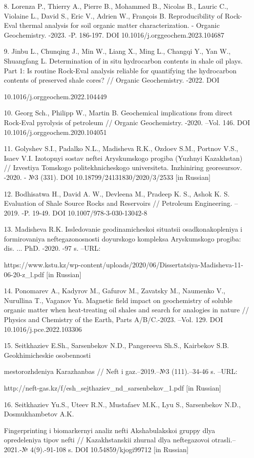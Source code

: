 \begin{noparindent}
8.
  Lorenza P., Thierry A., Pierre B., Mohammed B., Nicolas B., Lauric C.,
  Violaine L., David S., Eric V., Adrien W., François B. Reproducibility
  of Rock-Eval thermal analysis for soil organic matter
  characterization. - Organic Geochemistry. -2023. -P. 186-197. DOI
  10.1016/j.orggeochem.2023.104687

9.
  Jinbu L., Chunqing J., Min W., Liang X., Ming L., Changqi Y., Yan W.,
  Shuangfang L. Determination of in situ hydrocarbon contents in shale
  oil plays. Part 1: Is routine Rock-Eval analysis reliable for
  quantifying the hydrocarbon contents of preserved shale cores? //
  Organic Geochemistry. -2022. DOI

  10.1016/j.orggeochem.2022.104449

10.
  Georg Sch., Philipp W., Martin B. Geochemical implications from direct
  Rock-Eval pyrolysis of petroleum // Organic Geochemistry. -2020.
  --Vol. 146. DOI 10.1016/j.orggeochem.2020.104051

11.
  Golyshev S.I., Padalko N.L., Madisheva R.K., Ozdoev S.M., Portnov
  V.S., Isaev V.I. Izotopnyi sostav neftei Aryskumskogo progiba (Yuzhnyi
  Kazakhstan) // Izvestiya Tomskogo politekhnicheskogo universiteta.
  Inzhiniring georesursov. -2020. - №3 (331). DOI
  10.18799/24131830/2020/3/2533 {[}in Russian{]}

12.
  Bodhisatwa H., David A. W., Devleena M., Pradeep K. S., Ashok K. S.
  Evaluation of Shale Source Rocks and Reservoirs // Petroleum
  Engineering. --2019. -P. 19-49. DOI 10.1007/978-3-030-13042-8

13.
  Madisheva R.K. Issledovanie geodinamicheskoi situatsii
  osadkonakopleniya i formirovaniya neftegazonosnosti doyurskogo
  kompleksa Aryskumskogo progiba: dis. ... PhD. -2020. -97 s. --URL:

  https://www.kstu.kz/wp-content/uploads/2020/06/Dissertatsiya-Madisheva-11-06-20-z\_l.pdf
  {[}in Russian{]}

14.
  Ponomarev A., Kadyrov M., Gafurov M., Zavatsky M., Naumenko V.,
  Nurullina T., Vaganov Yu. Magnetic field impact on geochemistry of
  soluble organic matter when heat-treating oil shales and search for
  analogies in nature // Physics and Chemistry of the Earth, Parts
  A/B/C.-2023. --Vol. 129. DOI 10.1016/j.pce.2022.103306

15.
  Seitkhaziev E.Sh., Sarsenbekov N.D., Pangereeva Sh.S., Kairbekov S.B.
  Geokhimicheskie osobennosti

  mestorozhdeniya Karazhanbas //
  Neft\textquotesingle{} i gaz.--2019.--№3 (111).--34-46 s. --URL:

  http://neft-gas.kz/f/esh\_sejthaziev\_nd\_sarsenbekov\_1.pdf {[}in
  Russian{]}

16.
  Seitkhaziev Yu.S., Uteev R.N., Mustafaev M.K., Lyu S., Sarsenbekov
  N.D., Dosmukhambetov A.K.

  Fingerprinting i biomarkernyi analiz nefti
  Akshabulakskoi gruppy dlya opredeleniya tipov nefti // Kazakhstanskii
  zhurnal dlya neftegazovoi otrasli.--2021.-№ 4(9).-91-108 s. DOI
  10.54859/kjogi99712 {[}in Russian{]}
\end{noparindent}

